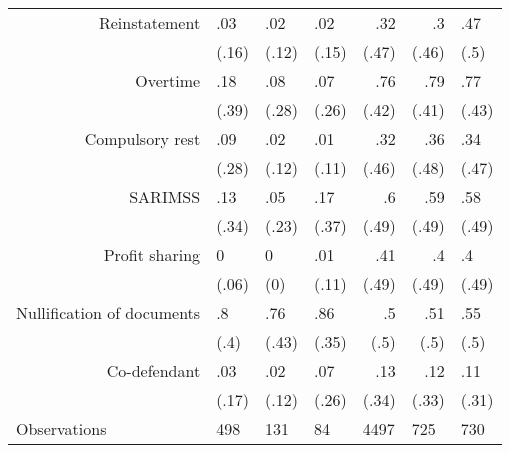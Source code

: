 \begin{tabular}{rrrrrrr}
      \midrule
      \midrule
Reinstatement & \multicolumn{1}{l}{.03} & \multicolumn{1}{l}{.02} & \multicolumn{1}{l}{.02} & .32   & .3    & \multicolumn{1}{l}{.47} \\
      & \multicolumn{1}{l}{(.16)} & \multicolumn{1}{l}{(.12)} & \multicolumn{1}{l}{(.15)} & (.47) & (.46) & \multicolumn{1}{l}{(.5)} \\
Overtime & \multicolumn{1}{l}{.18} & \multicolumn{1}{l}{.08} & \multicolumn{1}{l}{.07} & .76   & .79   & \multicolumn{1}{l}{.77} \\
      & \multicolumn{1}{l}{(.39)} & \multicolumn{1}{l}{(.28)} & \multicolumn{1}{l}{(.26)} & (.42) & (.41) & \multicolumn{1}{l}{(.43)} \\
Compulsory rest & \multicolumn{1}{l}{.09} & \multicolumn{1}{l}{.02} & \multicolumn{1}{l}{.01} & .32   & .36   & \multicolumn{1}{l}{.34} \\
      & \multicolumn{1}{l}{(.28)} & \multicolumn{1}{l}{(.12)} & \multicolumn{1}{l}{(.11)} & (.46) & (.48) & \multicolumn{1}{l}{(.47)} \\
SARIMSS & \multicolumn{1}{l}{.13} & \multicolumn{1}{l}{.05} & \multicolumn{1}{l}{.17} & .6    & .59   & \multicolumn{1}{l}{.58} \\
      & \multicolumn{1}{l}{(.34)} & \multicolumn{1}{l}{(.23)} & \multicolumn{1}{l}{(.37)} & (.49) & (.49) & \multicolumn{1}{l}{(.49)} \\
Profit sharing & \multicolumn{1}{l}{0} & \multicolumn{1}{l}{0} & \multicolumn{1}{l}{.01} & .41   & .4    & \multicolumn{1}{l}{.4} \\
      & \multicolumn{1}{l}{(.06)} & \multicolumn{1}{l}{(0)} & \multicolumn{1}{l}{(.11)} & (.49) & (.49) & \multicolumn{1}{l}{(.49)} \\
Nullification of documents & \multicolumn{1}{l}{.8} & \multicolumn{1}{l}{.76} & \multicolumn{1}{l}{.86} & .5    & .51   & \multicolumn{1}{l}{.55} \\
      & \multicolumn{1}{l}{(.4)} & \multicolumn{1}{l}{(.43)} & \multicolumn{1}{l}{(.35)} & (.5)  & (.5)  & \multicolumn{1}{l}{(.5)} \\
Co-defendant & \multicolumn{1}{l}{.03} & \multicolumn{1}{l}{.02} & \multicolumn{1}{l}{.07} & .13   & .12   & \multicolumn{1}{l}{.11} \\
      & \multicolumn{1}{l}{(.17)} & \multicolumn{1}{l}{(.12)} & \multicolumn{1}{l}{(.26)} & (.34) & (.33) & \multicolumn{1}{l}{(.31)} \\
      \bottomrule
\multicolumn{1}{l}{Observations} & \multicolumn{1}{l}{498} & \multicolumn{1}{l}{131} & \multicolumn{1}{l}{84} & \multicolumn{1}{l}{4497} & \multicolumn{1}{l}{725} & \multicolumn{1}{l}{730} \\
\bottomrule
\bottomrule
\end{tabular}%
